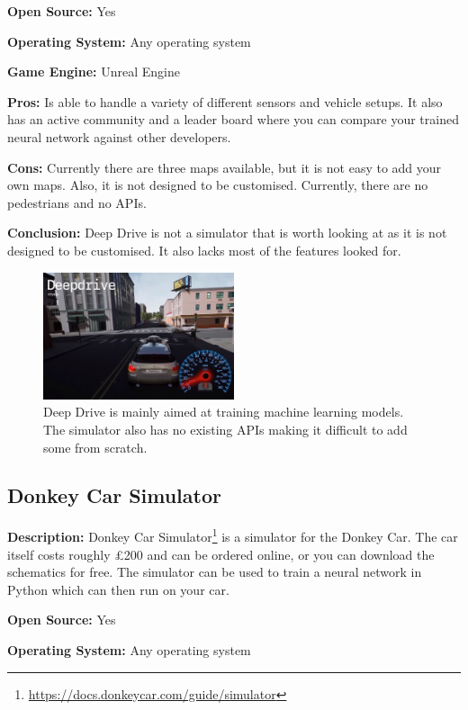 \textbf{Open Source:} Yes

\textbf{Operating System:} Any operating system

\textbf{Game Engine:} Unreal Engine

\textbf{Pros:} Is able to handle a variety of different sensors and vehicle setups. It also has an active community and a leader board where you can compare your trained neural network against other developers. 

\textbf{Cons:} Currently there are three maps available, but it is not easy to add your own maps. Also, it is not designed to be customised. Currently, there are no pedestrians and no APIs.

\textbf{Conclusion:} Deep Drive is not a simulator that is worth looking at as it is not designed to be customised. It also lacks most of the features looked for. 

\begin{figure}[H]
    \centering
    \includegraphics[width=0.5\textwidth]{03_Background/Appendix/Simulators/DeepDrive.JPG}
    \caption{Deep Drive is mainly aimed at training machine learning models. The simulator also has no existing APIs making it difficult to add some from scratch.}
\end{figure}

\subsection{Donkey Car Simulator}
\textbf{Description:} Donkey Car Simulator\footnote{\url{https://docs.donkeycar.com/guide/simulator}} is a simulator for the Donkey Car. The car itself costs roughly £200 and can be ordered online, or you can download the schematics for free. The simulator can be used to train a neural network in Python which can then run on your car. 

\textbf{Open Source:} Yes

\textbf{Operating System:} Any operating system

